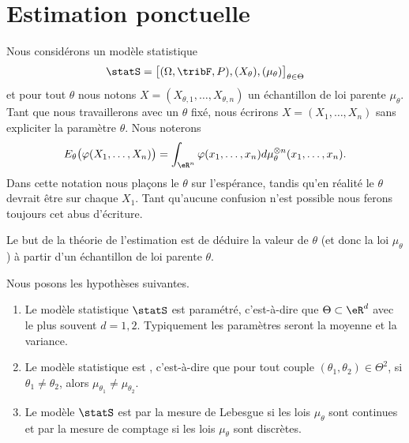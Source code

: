 \section{Estimation ponctuelle}

Nous considérons un modèle statistique
\begin{equation}
    \statS=\big[ (\Omega,\tribF,P),(X_{\theta}),(\mu_{\theta}) \big]_{\theta\in\Theta}
\end{equation}
et pour tout \( \theta\) nous notons \( X=(X_{\theta,1},\ldots,X_{\theta,n})\) un échantillon de loi parente \( \mu_{\theta}\). Tant que nous travaillerons avec un \( \theta\) fixé, nous écrirons \( X=(X_1,\ldots,X_n)\) sans expliciter la paramètre \( \theta\). Nous noterons
\begin{equation}        \label{EqFbKGZD}
    E_{\theta}\big( \varphi(X_1,\ldots,X_n) \big)=\int_{\eR^n}\varphi(x_1,\ldots,x_n)d\mu_{\theta}^{\otimes n}(x_1,\ldots,x_n).
\end{equation}
Dans cette notation nous plaçons le \( \theta\) sur l'espérance, tandis qu'en réalité le \( \theta\) devrait être sur chaque \( X_1\). Tant qu'aucune confusion n'est possible nous ferons toujours cet abus d'écriture.

Le but de la théorie de l'estimation est de déduire la valeur de \( \theta\) (et donc la loi \( \mu_{\theta}\)) à partir d'un échantillon de loi parente \( \theta\).

Nous posons les hypothèses suivantes.
\begin{enumerate}
    \item
        Le modèle statistique \( \statS\) est paramétré, c'est-à-dire que \( \Theta\subset\eR^d\) avec le plus souvent \( d=1,2\). Typiquement les paramètres seront la moyenne et la variance.
    \item
        Le modèle statistique est , c'est-à-dire que pour tout couple \( (\theta_1,\theta_2)\in\Theta^2\), si \( \theta_1\neq\theta_2\), alors \( \mu_{\theta_1}\neq\mu_{\theta_2}\).
    \item
        Le modèle \( \statS\) est  par la mesure de Lebesgue si les lois \( \mu_{\theta}\) sont continues et par la mesure de comptage si les lois \( \mu_{\theta}\) sont discrètes.
\end{enumerate}

